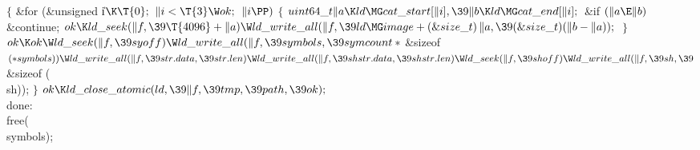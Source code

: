 ${}\{{}$\1\6
\&{for} (\&{unsigned} \|i${}\K\T{0};{}$ ${}\|i<\T{3}\W\\{ok};{}$ ${}\|i\PP){}$\5
${}\{{}$\1\6
${}\\{uint64\_t}\|a\K\\{ld}\MG\\{cat\_start}[\|i],\39\|b\K\\{ld}\MG\\{cat%
\_end}[\|i];{}$\6
\&{if} ${}(\|a\E\|b){}$\1\5
\&{continue};\2\6
${}\\{ok}\K\\{ld\_seek}(\|f,\39\T{4096}+\|a)\W\\{ld\_write\_all}(\|f,\39\\{ld}%
\MG\\{image}+(\&{size\_t})\,\|a,\39(\&{size\_t})(\|b-\|a));{}$\6
\4${}\}{}$\2\6
${}\\{ok}\K\\{ok}\W\\{ld\_seek}(\|f,\39\\{syoff})\W\\{ld\_write\_all}(\|f,\39%
\\{symbols},\39\\{symcount}*{}$\&{sizeof} ${}({*}\\{symbols}))\W\\{ld\_write%
\_all}(\|f,\39\\{str}.\\{data},\39\\{str}.\\{len})\W\\{ld\_write\_all}(\|f,\39%
\\{shstr}.\\{data},\39\\{shstr}.\\{len})\W\\{ld\_seek}(\|f,\39\\{shoff})\W\\{ld%
\_write\_all}(\|f,\39\\{sh},\39{}$\&{sizeof} (\\{sh}));\6
\4${}\}{}$\2\6
${}\\{ok}\K\\{ld\_close\_atomic}(\\{ld},\39\|f,\39\\{tmp},\39\\{path},\39%
\\{ok});{}$\6
\4\\{done}:\5
\\{free}(\\{symbols});\6

